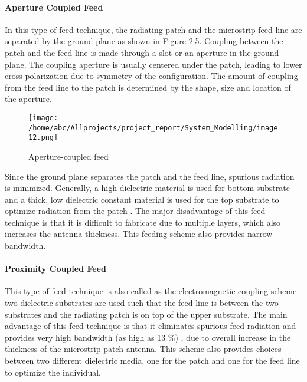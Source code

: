 \documentclass[12pt]{article}
\begin{document}
          \paragraph{Aperture Coupled Feed}
           \justify
            In this type of feed technique, the radiating patch and the microstrip feed line are separated by the ground plane as shown in Figure 2.5. Coupling between the patch and the feed line is made through a slot or an aperture in the ground plane.  The coupling aperture is usually centered under the patch, leading to lower cross-polarization due to symmetry of the configuration. The amount of coupling from the feed line to the patch is determined by the shape, size and location of the aperture.

              \begin{figure}[H]
              	\centering
              	\texttt{[image: /home/abc/Allprojects/project\_report/System\_Modelling/image12.png]}
              	\caption{Aperture-coupled feed }
              \end{figure}

             Since the ground plane separates the patch and the feed line, spurious radiation is minimized. Generally, a high dielectric material is used for bottom substrate and a thick, low dielectric constant material is used for the top substrate to optimize radiation from the patch . The major disadvantage of this feed technique is that it is difficult to fabricate due to multiple layers, which also increases the antenna thickness. This feeding scheme also provides narrow bandwidth.

           \paragraph{ Proximity Coupled Feed}
            \justify
             This type of feed technique is also called as the electromagnetic coupling scheme two dielectric substrates are used such that the feed line is between the two substrates and the radiating patch is on top of the upper substrate. The main advantage of this feed technique is that it eliminates spurious feed radiation and provides very high bandwidth (as high as 13 \%) , due to overall increase in the thickness of the microstrip patch antenna. This scheme also provides choices between two different dielectric media, one for the patch and one for the feed line to optimize the individual.
\end{document}
